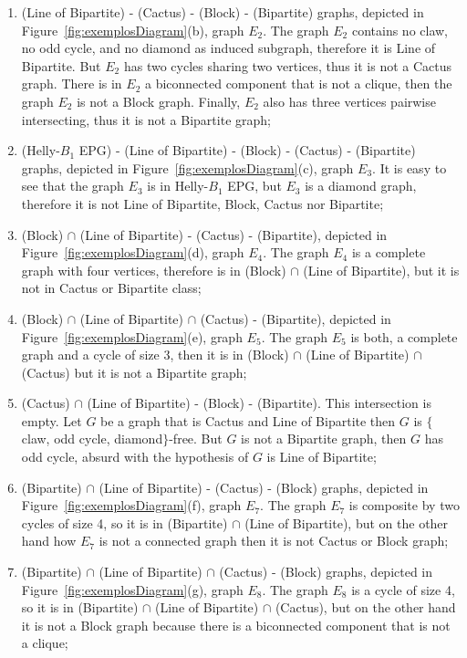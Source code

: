 \begin{enumerate}[label=(\arabic*)]
    \item (Line of Bipartite)  - (Cactus) - (Block) - (Bipartite) graphs, depicted in Figure~\ref{fig:exemplosDiagram}(b), graph $E_2$. The graph $E_2$ contains no claw, no odd cycle, and no diamond as induced subgraph, therefore it is Line of Bipartite. But $E_2$ has two cycles sharing two vertices, thus it is not a Cactus graph. There is  in $E_2$ a biconnected component that is not a clique, then the graph $E_2$ is not a Block graph. Finally, $E_2$ also  has three vertices pairwise intersecting, thus it is not a Bipartite graph;%
    \item (Helly-$B_1$ EPG) - (Line of Bipartite) - (Block) - (Cactus) - (Bipartite) graphs, depicted in Figure~\ref{fig:exemplosDiagram}(c), graph $E_3$. It is easy to see that the graph $E_3$ is in Helly-$B_1$ EPG, but $E_3$ is a  diamond graph, therefore it is not Line of Bipartite, Block, Cactus nor Bipartite;%
    \item (Block) $\cap$ (Line of Bipartite) - (Cactus) - (Bipartite), depicted in Figure~\ref{fig:exemplosDiagram}(d), graph $E_4$. The graph $E_4$ is a complete graph with four vertices, therefore is in (Block) $\cap$ (Line of Bipartite), but it is not in Cactus or Bipartite class;%
    \item (Block) $\cap$ (Line of Bipartite) $\cap$  (Cactus) - (Bipartite), depicted in Figure~\ref{fig:exemplosDiagram}(e), graph $E_5$. The graph $E_5$ is both, a complete graph and a cycle of size 3, then it is in (Block) $\cap$ (Line of Bipartite) $\cap$  (Cactus) but it is not a Bipartite graph; %
    \item (Cactus) $\cap$ (Line of Bipartite) - (Block) - (Bipartite). This intersection is empty. Let $G$ be a graph that is Cactus and Line of Bipartite then $G$ is $\{$claw, odd cycle, diamond$\}$-free. But $G$ is not a Bipartite graph, then $G$ has odd cycle, %
     absurd with the hypothesis of $G$ is Line of Bipartite;%
    \item (Bipartite) $\cap$ (Line of Bipartite)  - (Cactus) - (Block) graphs, depicted in Figure~\ref{fig:exemplosDiagram}(f), graph $E_7$. The graph $E_7$ is composite by two cycles of size 4, so it is in (Bipartite) $\cap$ (Line of Bipartite), but on the other hand how $E_7$ is not a connected graph then it is not Cactus or Block graph;%
    \item (Bipartite) $\cap$ (Line of Bipartite) $\cap$  (Cactus) - (Block) graphs, depicted in Figure~\ref{fig:exemplosDiagram}(g), graph $E_8$. The graph $E_8$ is a cycle of size 4, so it is in (Bipartite) $\cap$ (Line of Bipartite) $\cap$  (Cactus), but on the other hand it is not a Block graph because there is a biconnected component that is not a clique;%

\end{enumerate}
